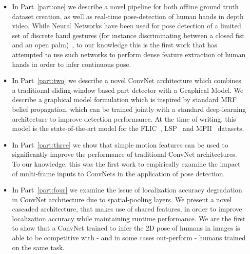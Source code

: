 \begin{itemize}

\item In Part~\ref{part:one} we describe a novel pipeline for both offline ground truth dataset creation, as well as real-time pose-detection of human hands in depth video. While Neural Networks have been used for pose detection of a limited set of discrete hand gestures (for instance discriminating between a closed fist and an open palm)~\cite{nagi,nowlan}, to our knowledge this is the first work that has attempted to use such networks to perform dense feature extraction of human hands in order to infer continuous pose.

\item In Part~\ref{part:two} we describe a novel ConvNet architecture which combines a traditional sliding-window based part detector with a Graphical Model. We describe a graphical model formulation which is inspired by standard MRF belief propagation, which can be trained jointly with a standard deep-learning architecture to improve detection performance. At the time of writing, this model is the state-of-the-art model for the FLIC~\cite{modec}, LSP~\cite{Johnson10} and MPII~\cite{andriluka14cvpr} datasets.

\item In Part~\ref{part:three} we show that simple motion features can be used to significantly improve the performance of traditional ConvNet architectures. To our knowledge, this was the first work to empirically examine the impact of multi-frame inputs to ConvNets in the application of pose detection.

\item In Part~\ref{part:four} we examine the issue of localization accuracy degradation in ConvNet architecture due to spatial-pooling layers. We present a novel cascaded architecture, that makes use of shared features, in order to improve localization accuracy while maintaining runtime performance. We are the first to show that a ConvNet trained to infer the 2D pose of humans in images is able to be competitive with - and in some cases out-perform - humans trained on the same task.

\end{itemize}